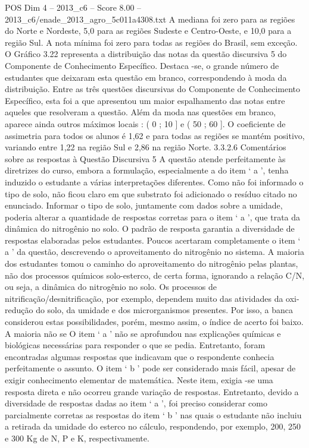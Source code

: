 \begin{textsample}{POS Dim 4 – 2013\_c6 – Score 8.00 – 2013\_c6/enade\_2013\_agro\_5c011a4308.txt}
A mediana foi zero para as regiões do Norte e Nordeste, 5,0 para as regiões Sudeste e Centro-Oeste, e 10,0 para a região Sul.
A nota mínima foi zero para todas as regiões do Brasil, sem exceção.
O Gráfico 3.22 representa a distribuição das notas da questão discursiva 5 do Componente de Conhecimento Específico.
Destaca -se, o grande número de estudantes que deixaram esta questão em branco, correspondendo à moda da distribuição.
Entre as três questões discursivas do Componente de Conhecimento Específico, esta foi a que apresentou um maior espalhamento das notas entre aqueles que resolveram a questão.
Além da moda nas questões em branco, aparece ainda outros máximos locais : ( 0 ; 10 ] e ( 50 ; 60 ].
O coeficiente de assimetria para todos os alunos é 1,62 e para todas as regiões se mantém positivo, variando entre 1,22 na região Sul e 2,86 na região Norte. 3.3.2.6 Comentários sobre as respostas à Questão Discursiva 5 A questão atende perfeitamente às diretrizes do curso, embora a formulação, especialmente a do item ‘ a ’, tenha induzido o estudante a várias interpretações diferentes.
Como não foi informado o tipo de solo, não ficou claro em que substrato foi adicionado o resíduo citado no enunciado.
Informar o tipo de solo, juntamente com dados sobre a umidade, poderia alterar a quantidade de respostas corretas para o item ‘ a ’, que trata da dinâmica do nitrogênio no solo.
O padrão de resposta garantia a diversidade de respostas elaboradas pelos estudantes.
Poucos acertaram completamente o item ‘ a ’ da questão, descrevendo o aproveitamento do nitrogênio no sistema.
A maioria dos estudantes tomou o caminho do aproveitamento do nitrogênio pelas plantas, não dos processos químicos solo-esterco, de certa forma, ignorando a relação C/N, ou seja, a dinâmica do nitrogênio no solo.
Os processos de nitrificação/desnitrificação, por exemplo, dependem muito das atividades da oxi-redução do solo, da umidade e dos microrganismos presentes.
Por isso, a banca considerou estas possibilidades, porém, mesmo assim, o índice de acerto foi baixo.
A maioria não se O item ‘ a ’ não se aprofundou nas explicações químicas e biológicas necessárias para responder o que se pedia.
Entretanto, foram encontradas algumas respostas que indicavam que o respondente conhecia perfeitamente o assunto.
O item ‘ b ’ pode ser considerado mais fácil, apesar de exigir conhecimento elementar de matemática.
Neste item, exigia -se uma resposta direta e não ocorreu grande variação de respostas.
Entretanto, devido a diversidade de respostas dadas ao item ‘ a ’, foi preciso considerar como parcialmente corretas as respostas do item ‘ b ’ nas quais o estudante não incluiu a retirada da umidade do esterco no cálculo, respondendo, por exemplo, 200, 250 e 300 Kg de N, P e K, respectivamente.

\end{textsample}
